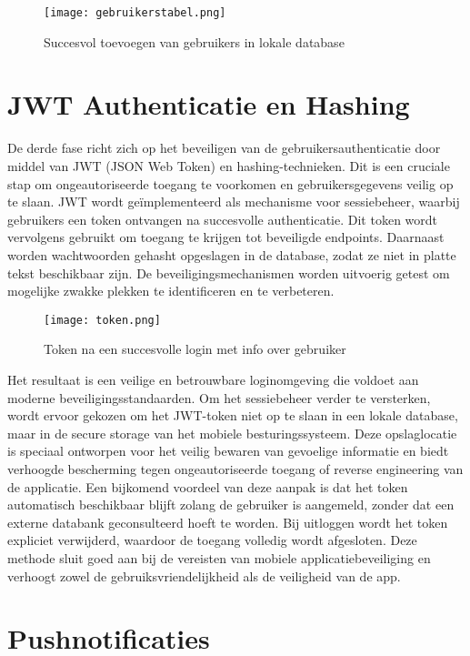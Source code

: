 \begin{figure}[H]
	\centering
	\texttt{[image: gebruikerstabel.png]}
	\caption{Succesvol toevoegen van gebruikers in lokale database}
	\label{fig:gebruikerstabel}
\end{figure}

\section{JWT Authenticatie en Hashing}

De derde fase richt zich op het beveiligen van de gebruikersauthenticatie door middel van JWT (JSON Web Token) en hashing-technieken. Dit is een cruciale stap om ongeautoriseerde toegang te voorkomen en gebruikersgegevens veilig op te slaan. JWT wordt geïmplementeerd als mechanisme voor sessiebeheer, waarbij gebruikers een token ontvangen na succesvolle authenticatie. Dit token wordt vervolgens gebruikt om toegang te krijgen tot beveiligde endpoints. Daarnaast worden wachtwoorden gehasht opgeslagen in de database, zodat ze niet in platte tekst beschikbaar zijn. De beveiligingsmechanismen worden uitvoerig getest om mogelijke zwakke plekken te identificeren en te verbeteren. \\

\begin{figure}[H]
	\centering
	\texttt{[image: token.png]}
	\caption{Token na een succesvolle login met info over gebruiker}
	\label{fig:token}
\end{figure}

Het resultaat is een veilige en betrouwbare loginomgeving die voldoet aan moderne beveiligingsstandaarden. Om het sessiebeheer verder te versterken, wordt ervoor gekozen om het JWT-token niet op te slaan in een lokale database, maar in de secure storage van het mobiele besturingssysteem. Deze opslaglocatie is speciaal ontworpen voor het veilig bewaren van gevoelige informatie en biedt verhoogde bescherming tegen ongeautoriseerde toegang of reverse engineering van de applicatie. Een bijkomend voordeel van deze aanpak is dat het token automatisch beschikbaar blijft zolang de gebruiker is aangemeld, zonder dat een externe databank geconsulteerd hoeft te worden. Bij uitloggen wordt het token expliciet verwijderd, waardoor de toegang volledig wordt afgesloten. Deze methode sluit goed aan bij de vereisten van mobiele applicatiebeveiliging en verhoogt zowel de gebruiksvriendelijkheid als de veiligheid van de app.

\section{Pushnotificaties}

